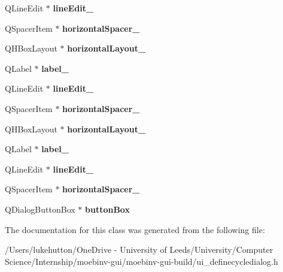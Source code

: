 \begin{DoxyCompactItemize}
\item 
\mbox{\label{class_ui__define_cycle_dialog_a3d5520f021e4be628878c16356d867e4}} 
Q\+Line\+Edit $\ast$ {\bfseries line\+Edit\+\_}
\item 
\mbox{\label{class_ui__define_cycle_dialog_a9eb7ed48f73134128d9c641db721d41f}} 
Q\+Spacer\+Item $\ast$ {\bfseries horizontal\+Spacer\+\_}
\item 
\mbox{\label{class_ui__define_cycle_dialog_a03c84f7955219dc3905bb5ca4f0af39e}} 
Q\+H\+Box\+Layout $\ast$ {\bfseries horizontal\+Layout\+\_}
\item 
\mbox{\label{class_ui__define_cycle_dialog_a6f26b71d4b3e5be6f5561d045125198c}} 
Q\+Label $\ast$ {\bfseries label\+\_}
\item 
\mbox{\label{class_ui__define_cycle_dialog_aa19a105e0b9670c923be42cf953a55e0}} 
Q\+Line\+Edit $\ast$ {\bfseries line\+Edit\+\_}
\item 
\mbox{\label{class_ui__define_cycle_dialog_ab4de9ae4f5fb1e738c22bd8d2fbb8571}} 
Q\+Spacer\+Item $\ast$ {\bfseries horizontal\+Spacer\+\_}
\item 
\mbox{\label{class_ui__define_cycle_dialog_a103cdf5b651b17a0716c66891b5a11df}} 
Q\+H\+Box\+Layout $\ast$ {\bfseries horizontal\+Layout\+\_}
\item 
\mbox{\label{class_ui__define_cycle_dialog_a7c005f2e7df6caa5e9b81ed1716c0382}} 
Q\+Label $\ast$ {\bfseries label\+\_}
\item 
\mbox{\label{class_ui__define_cycle_dialog_ae3e3d1bd890adbe23502349a6b2fe90a}} 
Q\+Line\+Edit $\ast$ {\bfseries line\+Edit\+\_}
\item 
\mbox{\label{class_ui__define_cycle_dialog_a56c94e17b5226b6c00588a9085e4ee89}} 
Q\+Spacer\+Item $\ast$ {\bfseries horizontal\+Spacer\+\_}
\item 
\mbox{\label{class_ui__define_cycle_dialog_ae1d3f2442bdfe35eccc053c09694f7f2}} 
Q\+Dialog\+Button\+Box $\ast$ {\bfseries button\+Box}
\end{DoxyCompactItemize}


The documentation for this class was generated from the following file\+:\begin{DoxyCompactItemize}
\item 
/\+Users/lukehutton/\+One\+Drive -\/ University of Leeds/\+University/\+Computer Science/\+Internship/moebinv-\/gui/moebinv-\/gui-\/build/ui\+\_\+definecycledialog.\+h\end{DoxyCompactItemize}
